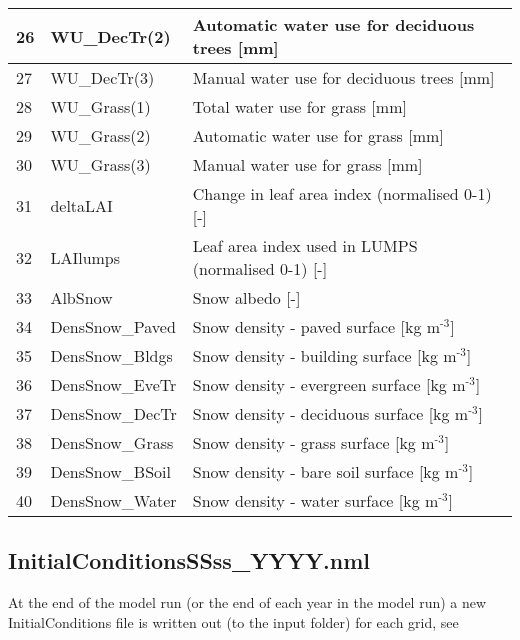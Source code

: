 \documentclass[letterpaper,10pt,english]{sphinxmanual}
\begin{document}
\begin{savenotes}
\begin{longtable}{|l|l|l|}
\\
\hline
26
&
WU\_DecTr(2)
&
Automatic water use for deciduous trees {[}mm{]}
\\
\hline
27
&
WU\_DecTr(3)
&
Manual water use for deciduous trees {[}mm{]}
\\
\hline
28
&
WU\_Grass(1)
&
Total water use for grass {[}mm{]}
\\
\hline
29
&
WU\_Grass(2)
&
Automatic water use for grass {[}mm{]}
\\
\hline
30
&
WU\_Grass(3)
&
Manual water use for grass {[}mm{]}
\\
\hline
31
&
deltaLAI
&
Change in leaf area index (normalised 0-1) {[}-{]}
\\
\hline
32
&
LAIlumps
&
Leaf area index used in LUMPS (normalised 0-1) {[}-{]}
\\
\hline
33
&
AlbSnow
&
Snow albedo {[}-{]}
\\
\hline
34
&
DensSnow\_Paved
&
Snow density - paved surface {[}kg m$^{\text{-3}}${]}
\\
\hline
35
&
DensSnow\_Bldgs
&
Snow density - building surface {[}kg m$^{\text{-3}}${]}
\\
\hline
36
&
DensSnow\_EveTr
&
Snow density - evergreen surface {[}kg m$^{\text{-3}}${]}
\\
\hline
37
&
DensSnow\_DecTr
&
Snow density - deciduous surface {[}kg m$^{\text{-3}}${]}
\\
\hline
38
&
DensSnow\_Grass
&
Snow density - grass surface {[}kg m$^{\text{-3}}${]}
\\
\hline
39
&
DensSnow\_BSoil
&
Snow density - bare soil surface {[}kg m$^{\text{-3}}${]}
\\
\hline
40
&
DensSnow\_Water
&
Snow density - water surface {[}kg m$^{\text{-3}}${]}
\\
\hline
\end{longtable}\sphinxatlongtableend\end{savenotes}


\subsection{InitialConditionsSSss\_YYYY.nml}
\label{\detokenize{output_files/output_files:initialconditionsssss-yyyy-nml}}\label{\detokenize{output_files/output_files:id2}}
At the end of the model run (or the end of each year in the model run) a
new InitialConditions file is written out (to the input folder) for each
grid, see {\hyperref[\detokenize{input_files/Initial_Conditions/Initial_Conditions:initial-conditions}]{}}
\end{document}
